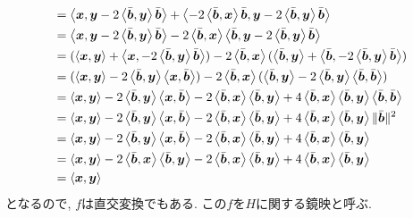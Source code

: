 \begin{example}
\begin{align*}
    &=
    \Braket{\xx,\yy-2\Braket{\bar\bbb,\yy}\bar\bbb}
    +\Braket{-2\Braket{\bar\bbb,\xx}\bar\bbb,\yy-2\Braket{\bar\bbb,\yy}\bar\bbb}\\
    &=
    \Braket{\xx,\yy-2\Braket{\bar\bbb,\yy}\bar\bbb}
    -2\Braket{\bar\bbb,\xx}\Braket{\bar\bbb,\yy-2\Braket{\bar\bbb,\yy}\bar\bbb}\\
    &=
    (\Braket{\xx,\yy}
    +\Braket{\xx,-2\Braket{\bar\bbb,\yy}\bar\bbb})
    -2\Braket{\bar\bbb,\xx}(
    \Braket{\bar\bbb,\yy}
    +\Braket{\bar\bbb,-2\Braket{\bar\bbb,\yy}\bar\bbb}
    )\\
    &=
    (\Braket{\xx,\yy}
    -2\Braket{\bar\bbb,\yy}\Braket{\xx,\bar\bbb})
    -2\Braket{\bar\bbb,\xx}(
    \Braket{\bar\bbb,\yy}
    -2\Braket{\bar\bbb,\yy}\Braket{\bar\bbb,\bar\bbb}
    )\\
    &=
    \Braket{\xx,\yy}
    -2\Braket{\bar\bbb,\yy}\Braket{\xx,\bar\bbb}
    -2\Braket{\bar\bbb,\xx}
    \Braket{\bar\bbb,\yy}
    +4\Braket{\bar\bbb,\xx}\Braket{\bar\bbb,\yy}\Braket{\bar\bbb,\bar\bbb}
    \\
    &=
    \Braket{\xx,\yy}
    -2\Braket{\bar\bbb,\yy}\Braket{\xx,\bar\bbb}
    -2\Braket{\bar\bbb,\xx}\Braket{\bar\bbb,\yy}
    +4\Braket{\bar\bbb,\xx}\Braket{\bar\bbb,\yy}\|\bar\bbb\|^2
    \\
    &=
    \Braket{\xx,\yy}
    -2\Braket{\bar\bbb,\yy}\Braket{\xx,\bar\bbb}
    -2\Braket{\bar\bbb,\xx}\Braket{\bar\bbb,\yy}
    +4\Braket{\bar\bbb,\xx}\Braket{\bar\bbb,\yy}
    \\
    &=
    \Braket{\xx,\yy}
    -2\Braket{\bar\bbb,\xx}\Braket{\bar\bbb,\yy}
    -2\Braket{\bar\bbb,\xx}\Braket{\bar\bbb,\yy}
    +4\Braket{\bar\bbb,\xx}\Braket{\bar\bbb,\yy}
    \\
    &=
    \Braket{\xx,\yy}
  \end{align*}
  となるので, $f$は直交変換でもある.
  この$f$を$H$に関する鏡映と呼ぶ.
\end{example}

